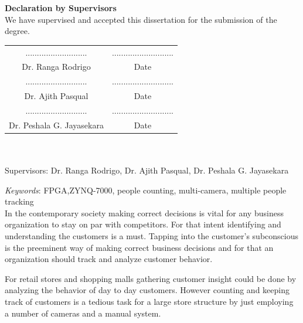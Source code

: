 \documentclass[12pt,a4paper]{report}
\begin{document}
\newpage
\noindent \textbf{Declaration by Supervisors}\\[0.5cm]
We have supervised and accepted this dissertation for the submission of the degree.\\[1cm]
\begin{table}[h]
\begin{tabular}{cc}
........................... & \hspace{5cm}........................... \\
Dr. Ranga Rodrigo           & \hspace{5cm}Date                        \\[1cm]
........................... & \hspace{5cm}........................... \\
Dr. Ajith Pasqual           & \hspace{5cm}Date                        \\[1cm]
........................... & \hspace{5cm}........................... \\
Dr. Peshala G. Jayasekara   & \hspace{5cm}Date                       
\end{tabular}
\end{table}
\newpage
{}
\begin{center}
\fontsize{18pt}{18}\\[0.5cm]
\fontsize{12pt}{12}\selectfont{Group Members: R.V.C.N Abeyrathne, D.L Dampahalage, H.A.S.P Gunasekara, W.M.D.K Weerakoon}\\[0.25cm]
Supervisors: Dr. Ranga Rodrigo, Dr. Ajith Pasqual, Dr. Peshala G. Jayasekara
\end{center}
\textit{Keywords}: FPGA,ZYNQ-7000, people counting, multi-camera, multiple people tracking\\[0.5cm]
In the contemporary society making correct decisions is vital for any business organization to stay on par with competitors. For that intent identifying and understanding the customers is a must. Tapping into the customer's subconscious is the preeminent way of making correct business decisions and for that an organization should track and analyze customer behavior.
\par For retail stores and shopping malls gathering customer insight could be done by analyzing the behavior of day to day customers. However counting and keeping track of customers is a tedious task for a large store structure by just employing a number of cameras and a manual system.
\end{document}
